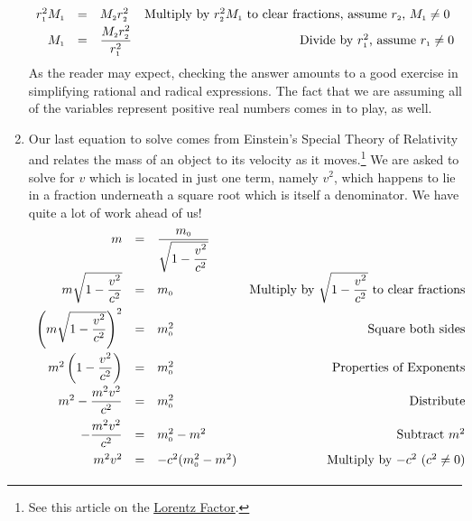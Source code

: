 \documentclass{ximera}
\begin{document}
\begin{example}
\begin{enumerate}
\[\begin{array}{rclr}
r_{\text{\tiny$1$}}^2 M_{\text{\tiny$1$}} & = & M_{\text{\tiny$2$}}r_{\text{\tiny$2$}}^2 & \text{Multiply by $r_{\text{\tiny$2$}}^2 M_{\text{\tiny$1$}}$ to clear fractions, assume $r_{\text{\tiny$2$}}$,  $M_{\text{\tiny$1$}} \neq 0$ } \\[2pt]


M_{\text{\tiny$1$}} & = & \dfrac{M_{\text{\tiny$2$}}r_{\text{\tiny$2$}}^2}{r_{\text{\tiny$1$}}^2} & \text{Divide by $r_{\text{\tiny$1$}}^2$, assume $r_{\text{\tiny$1$}} \neq 0$} \\
\end{array} \] As the reader may expect, checking the answer amounts to a good exercise in simplifying rational and radical expressions.  The fact that we are assuming all of the variables represent positive real numbers comes in to play, as well.

\item  Our last equation to solve comes from Einstein's Special Theory of Relativity and relates the mass of an object to its velocity as it moves.\footnote{See this article on the \href{http://en.wikipedia.org/wiki/Lorentz_factor}{\underline{Lorentz Factor}}.} We are asked to solve for $v$ which is located in just one term, namely $v^2$, which happens to lie in a fraction underneath a square root which is itself a denominator. We have quite a lot of work ahead of us!\[ \begin{array}{rclr}

 m &  = & \dfrac{m_{\text{\tiny$0$}}}{\sqrt{1 - \dfrac{v^2}{c^2}}} & \\

m \sqrt{1 - \dfrac{v^2}{c^2}} & = & m_{\text{\tiny$0$}} & \text{Multiply by $\sqrt{1 - \dfrac{v^2}{c^2}}$ to clear fractions}\\ [8pt]

\left(m \sqrt{1 - \dfrac{v^2}{c^2}}\right)^{2} & = & m_{\text{\tiny$0$}}^{2} & \text{Square both sides}\\ [12pt]

m^2 \left(1 - \dfrac{v^2}{c^2}\right) & = &  m_{\text{\tiny$0$}}^{2} & \text{Properties of Exponents}\\[8pt]

m^2 - \dfrac{m^2 v^2}{c^2} & = & m_{\text{\tiny$0$}}^{2} & \text{Distribute} \\[8pt]

- \dfrac{m^2 v^2}{c^2} & = & m_{\text{\tiny$0$}}^{2} - m^2 & \text{Subtract $m^2$}  \\ [8pt]

m^2 v^2 & = & -c^2 (m_{\text{\tiny$0$}}^{2} - m^2)  & \text{Multiply by $-c^2$ ($c^2 \neq 0$)} \\ [2pt]


\end{array}\]
\end{enumerate}
\end{example}
\end{document}
